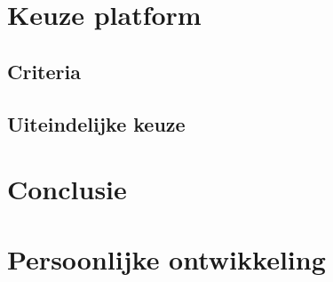 \documentclass[a4paper,12pt,oneside]{report}
\begin{document}
\chapter{Keuze platform}
\lipsum[8]
\section{Criteria}
\lipsum[9]

\section{Uiteindelijke keuze}
\lipsum[10]




\chapter{Conclusie}
\lipsum[11-14]




\appendix
\chapter{Persoonlijke ontwikkeling}
\lipsum[1]

\newpage

\printglossary


\renewcommand{\bibname}{Bronvermeldingen}


\nocite{*}

\end{document}

